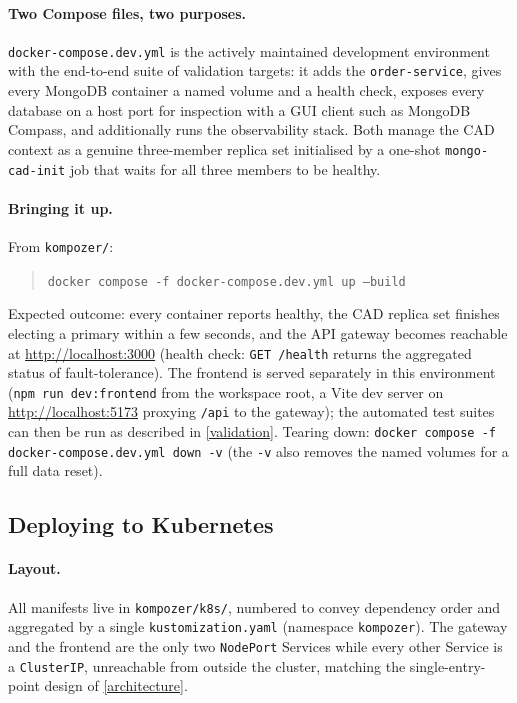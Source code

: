 \paragraph{Two Compose files, two purposes.} \texttt{docker-compose.dev.yml} is the
actively maintained development environment with the end-to-end
suite of validation targets: it adds the \texttt{order-service},
gives every MongoDB container a named volume and a health check, exposes
every database on a host port for inspection with a GUI client such as
MongoDB Compass, and additionally runs the observability stack.
Both manage the CAD context as a genuine three-member replica set initialised by a one-shot
\texttt{mongo-cad-init} job that waits for all three members to be healthy.

\begin{sloppypar}
\paragraph{Bringing it up.} From \texttt{kompozer/}:
\begin{quote}
\texttt{docker compose -f docker-compose.dev.yml up --build}
\end{quote}
Expected outcome: every container reports healthy, the CAD replica set
finishes electing a primary within a few seconds, and the API gateway
becomes reachable at \url{http://localhost:3000} (health check:
\texttt{GET /health} returns the aggregated status of
fault-tolerance). The frontend is served separately in this
environment (\texttt{npm run dev:frontend} from the workspace root, a Vite
dev server on \url{http://localhost:5173} proxying \texttt{/api} to the
gateway); the automated test suites can then be run as described in
\cref{validation}. Tearing down: \texttt{docker compose -f
docker-compose.dev.yml down -v} (the \texttt{-v} also removes the named
volumes for a full data reset).
\end{sloppypar}

\subsection{Deploying to Kubernetes}\label{deployment-kubernetes}

\paragraph{Layout.} All manifests live in \texttt{kompozer/k8s/}, numbered to
convey dependency order and aggregated by a single
\texttt{kustomization.yaml} (namespace \texttt{kompozer}).
The gateway and the frontend are the only two \texttt{NodePort} Services while
every other Service is a \texttt{ClusterIP}, unreachable from outside the
cluster, matching the single-entry-point design of \cref{architecture}.

